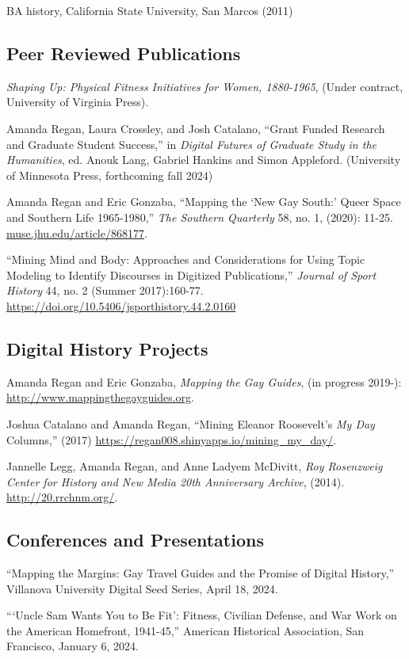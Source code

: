 \documentclass[11pt]{article}
\begin{document}
BA history, California State University, San Marcos (2011)


\subsection{Peer Reviewed Publications}\label{peer-reviewed}

\emph{Shaping Up: Physical Fitness Initiatives for Women, 1880-1965}, (Under contract, University of Virginia Press).

Amanda Regan, Laura Crossley, and Josh Catalano, ``Grant Funded Research and Graduate Student Success,'' in \emph{Digital Futures of Graduate Study in the Humanities}, ed. Anouk Lang, Gabriel Hankins and Simon Appleford. (University of Minnesota Press, forthcoming fall 2024)

Amanda Regan and Eric Gonzaba, ``Mapping the `New Gay South:' Queer Space and Southern Life 1965-1980,'' \emph{The Southern Quarterly} 58, no. 1, (2020): 11-25. \url{muse.jhu.edu/article/868177}.

``Mining Mind and Body: Approaches and Considerations for Using Topic Modeling to Identify Discourses in Digitized Publications,'' \emph{Journal of Sport History} 44, no. 2 (Summer 2017):160-77. \url{https://doi.org/10.5406/jsporthistory.44.2.0160}

\subsection{Digital History Projects}
Amanda Regan and Eric Gonzaba, \emph{Mapping the Gay Guides}, (in progress 2019-): \url{http://www.mappingthegayguides.org}.

Joshua Catalano and Amanda Regan, ``Mining Eleanor Roosevelt's \emph{My Day} Columns,'' (2017) \url{https://regan008.shinyapps.io/mining_my_day/}.

Jannelle Legg, Amanda Regan, and Anne Ladyem McDivitt, \emph{Roy Rosenzweig Center for History and New Media 20th Anniversary Archive}, (2014). \url{http://20.rrchnm.org/}.

\subsection{Conferences and Presentations}

``Mapping the Margins: Gay Travel Guides and the Promise of Digital History,'' Villanova University Digital Seed Series, April 18, 2024.

```Uncle Sam Wants You to Be Fit': Fitness, Civilian Defense, and War Work on the American Homefront, 1941-45,'' American Historical Association, San Francisco, January 6, 2024.
\end{document}
